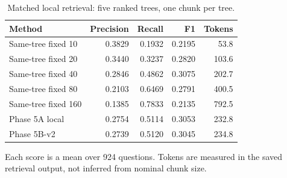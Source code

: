 \begin{table}[htbp]
\centering\small
\caption{Matched local retrieval: five ranked trees, one chunk per tree.}
\label{tab:localresults}
\begin{tabular}{@{}lrrrr@{}}
\toprule
Method & Precision & Recall & F1 & Tokens\\
\midrule
Same-tree fixed 10 & 0.3829 & 0.1932 & 0.2195 & 53.8\\
Same-tree fixed 20 & 0.3440 & 0.3237 & 0.2820 & 103.6\\
Same-tree fixed 40 & 0.2846 & 0.4862 & 0.3075 & 202.7\\
Same-tree fixed 80 & 0.2103 & 0.6469 & 0.2791 & 400.5\\
Same-tree fixed 160 & 0.1385 & 0.7833 & 0.2135 & 792.5\\
Phase 5A local & 0.2754 & 0.5114 & 0.3053 & 232.8\\
Phase 5B-v2 & 0.2739 & 0.5120 & 0.3045 & 234.8\\
\bottomrule
\end{tabular}
\par\smallskip\begin{minipage}{\textwidth}\footnotesize Each score is a mean over 924 questions. Tokens are measured in the saved retrieval output, not inferred from nominal chunk size.\end{minipage}
\end{table}
